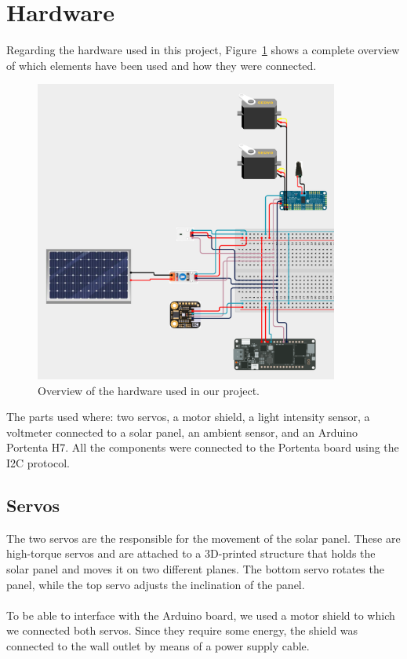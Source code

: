 \section*{Hardware}

Regarding the hardware used in this project, Figure~\ref{fig:circuit} shows a complete overview of which elements have been used and how they were connected.
\begin{figure}[h]
    \centering
    \includegraphics[width=10cm]{../assets/png/project-circuit}
    \caption{Overview of the hardware used in our project.}
    \label{fig:circuit}
\end{figure}
The parts used where: two servos, a motor shield, a light intensity sensor, a voltmeter connected to a solar panel, an ambient sensor, and an Arduino Portenta H7.
All the components were connected to the Portenta board using the I2C protocol.

\subsection*{Servos}
The two servos are the responsible for the movement of the solar panel.
These are high-torque servos and are attached to a 3D-printed structure that holds the solar panel and moves it on two different planes.
The bottom servo rotates the panel, while the top servo adjusts the inclination of the panel. \\ \\
To be able to interface with the Arduino board, we used a motor shield to which we connected both servos.
Since they require some energy, the shield was connected to the wall outlet by means of a power supply cable.

